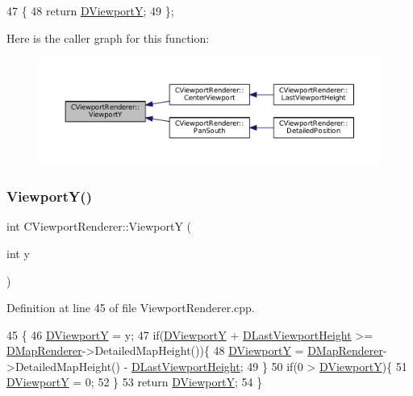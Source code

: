 \begin{DoxyCode}
47                              \{
48             \textcolor{keywordflow}{return} \hyperlink{classCViewportRenderer_ae13dd437a3da3d2bab16bc7ba61cb78f}{DViewportY};  
49         \};
\end{DoxyCode}
Here is the caller graph for this function\+:\nopagebreak
\begin{figure}[H]
\begin{center}
\leavevmode
\includegraphics[width=350pt]{classCViewportRenderer_add3d4da286927abe2f19fbb37fd42ed5_icgraph}
\end{center}
\end{figure}
\hypertarget{classCViewportRenderer_aebbe5e095b192de093376cde3cfc82dc}{}\label{classCViewportRenderer_aebbe5e095b192de093376cde3cfc82dc} 
\subsubsection{\texorpdfstring{Viewport\+Y()}{ViewportY()}\hspace{0.1cm}{\footnotesize\ttfamily [2/2]}}
{\footnotesize\ttfamily int C\+Viewport\+Renderer\+::\+ViewportY (\begin{DoxyParamCaption}\item[{int}]{y }\end{DoxyParamCaption})}



Definition at line 45 of file Viewport\+Renderer.\+cpp.


\begin{DoxyCode}
45                                      \{
46     \hyperlink{classCViewportRenderer_ae13dd437a3da3d2bab16bc7ba61cb78f}{DViewportY} = y;
47     \textcolor{keywordflow}{if}(\hyperlink{classCViewportRenderer_ae13dd437a3da3d2bab16bc7ba61cb78f}{DViewportY} + \hyperlink{classCViewportRenderer_aaca5c330615fc2aacc57dede8e7c18b0}{DLastViewportHeight} >= 
      \hyperlink{classCViewportRenderer_ac6bc7771bd6dcd35107d25bebb0c0a4c}{DMapRenderer}->DetailedMapHeight())\{
48         \hyperlink{classCViewportRenderer_ae13dd437a3da3d2bab16bc7ba61cb78f}{DViewportY} = \hyperlink{classCViewportRenderer_ac6bc7771bd6dcd35107d25bebb0c0a4c}{DMapRenderer}->DetailedMapHeight() - 
      \hyperlink{classCViewportRenderer_aaca5c330615fc2aacc57dede8e7c18b0}{DLastViewportHeight};
49     \}
50     \textcolor{keywordflow}{if}(0 > \hyperlink{classCViewportRenderer_ae13dd437a3da3d2bab16bc7ba61cb78f}{DViewportY})\{
51         \hyperlink{classCViewportRenderer_ae13dd437a3da3d2bab16bc7ba61cb78f}{DViewportY} = 0;
52     \}
53     \textcolor{keywordflow}{return} \hyperlink{classCViewportRenderer_ae13dd437a3da3d2bab16bc7ba61cb78f}{DViewportY};
54 \}
\end{DoxyCode}


